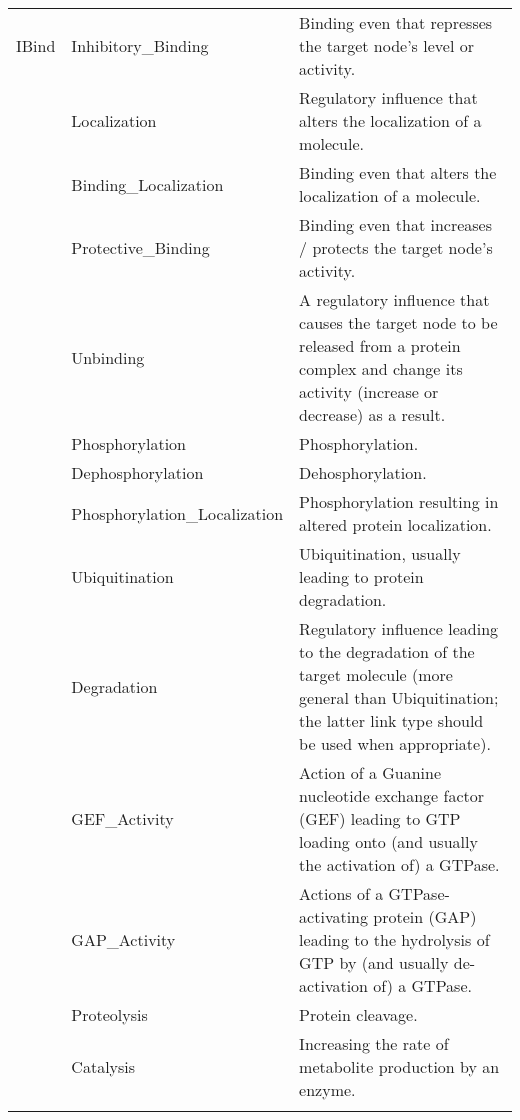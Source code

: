 \documentclass{article}
\begin{document}
\begin{subtables}
\begin{longtable}[c]{@{}llp{}@{}}
{\footnotesize{}IBind}&Inhibitory\_{}Binding&Binding even that represses the target node’s level or activity.\\\addlinespace[\dimexpr0.75\defaultaddspace]
{\footnotesize{}Loc}&Localization&Regulatory influence that alters the localization of a molecule.\\\addlinespace[\dimexpr0.75\defaultaddspace]
{\footnotesize{}BLoc}&Binding\_{}Localization&Binding even that alters the localization of a molecule.\\\addlinespace[\dimexpr0.75\defaultaddspace]
{\footnotesize{}PBind}&Protective\_{}Binding&Binding even that increases / protects the target node’s activity.\\\addlinespace[\dimexpr0.75\defaultaddspace]
{\footnotesize{}Unbind}&Unbinding&A regulatory influence that causes the target node to be released from a protein complex and change its activity (increase or decrease) as a result.\\\addlinespace[\dimexpr0.75\defaultaddspace]
{\footnotesize{}P}&Phosphorylation&Phosphorylation.\\\addlinespace[\dimexpr0.75\defaultaddspace]
{\footnotesize{}DP}&Dephosphorylation&Dehosphorylation.\\\addlinespace[\dimexpr0.75\defaultaddspace]
{\footnotesize{}PLoc}&Phosphorylation\_{}Localization&Phosphorylation resulting in altered protein localization.\\\addlinespace[\dimexpr0.75\defaultaddspace]
{\footnotesize{}Ubiq}&Ubiquitination&Ubiquitination, usually leading to protein degradation.\\\addlinespace[\dimexpr0.75\defaultaddspace]
{\footnotesize{}Deg}&Degradation&Regulatory influence leading to the degradation of the target molecule (more general than Ubiquitination; the latter link type should be used when appropriate).\\\addlinespace[\dimexpr0.75\defaultaddspace]
{\footnotesize{}GEF}&GEF\_{}Activity&Action of a Guanine nucleotide exchange factor (GEF) leading to GTP loading onto (and usually the activation of) a GTPase.\\\addlinespace[\dimexpr0.75\defaultaddspace]
{\footnotesize{}GAP}&GAP\_{}Activity&Actions of a GTPase-activating protein (GAP) leading to the hydrolysis of GTP by (and usually de-activation of) a GTPase.\\\addlinespace[\dimexpr0.75\defaultaddspace]
{\footnotesize{}Lysis}&Proteolysis&Protein cleavage.\\\addlinespace[\dimexpr0.75\defaultaddspace]
{\footnotesize{}Cat}&Catalysis&Increasing the rate of metabolite production by an enzyme.\\

\end{longtable}
\end{subtables}
\end{document}
